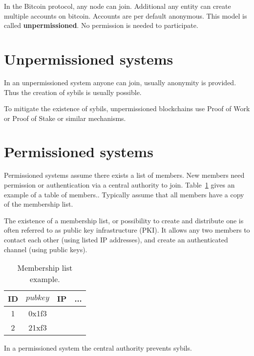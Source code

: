 
\noindent
In the Bitcoin protocol, any node can join. Additional any entity can create multiple accounts on bitcoin. Accounts are per default anonymous.
This model is called \textbf{unpermissioned}. No permission is needed to participate. 

\section{Unpermissioned systems}
In an unpermissioned system anyone can join, usually anonymity is provided.
Thus the creation of sybils is usually possible.

To mitigate the existence of sybils, unpermissioned blockchains use Proof of Work or Proof of Stake or similar mechanisms.

\section{Permissioned systems}
Permissioned systems assume there exists a list of members.
New members need permission or authentication via a central authority to join. 
Table~\ref{tab:members} gives an example of a table of members.. Typically assume that all members have a copy of the membership list. 

The existence of a membership list, or possibility to create and distribute one
is often referred to as public key infrastructure (PKI).
It allows any two members to contact each other (using listed IP addresses), and create an authenticated channel (using public keys).

\begin{table}[h]
	\centering
	\begin{tabular}{| c | c | c | c | }
		\hline
		ID & $pubkey$ & IP & ... \\
		\hline
		1 & 0x1f3 & &\\
		\hline
		2 & 21xf3 & &\\
		\hline
		
	\end{tabular}
	\caption{Membership list example. \label{tab:members}}
\end{table}

In a permissioned system the central authority prevents sybils.

